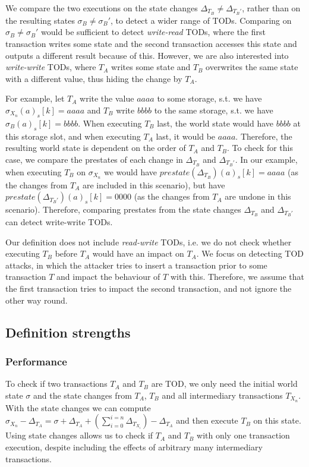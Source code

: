\documentclass[draft,final]{vutinfth} %
\begin{document}
We compare the two executions on the state changes $\Delta_{T_B} \neq \Delta_{T_B\prime}$, rather than on the resulting states $\sigma_B \neq \sigma_B\prime$, to detect a wider range of TODs. Comparing on $\sigma_B \neq \sigma_B\prime$ would be sufficient to detect \emph{write-read} TODs, where the first transaction writes some state and the second transaction accesses this state and outputs a different result because of this. However, we are also interested into \emph{write-write} TODs, where $T_A$ writes some state and $T_B$ overwrites the same state with a different value, thus hiding the change by $T_A$.

For example, let $T_A$ write the value $aaaa$ to some storage, s.t. we have $\sigma_{X_n}(a)_s[k] = aaaa$ and $T_B$ write $bbbb$ to the same storage, s.t. we have $\sigma_B(a)_s[k] = bbbb$. When executing $T_B$ last, the world state would have $bbbb$ at this storage slot, and when executing $T_A$ last, it would be $aaaa$. Therefore, the resulting world state is dependent on the order of $T_A$ and $T_B$. To check for this case, we compare the prestates of each change in $\Delta_{T_B}$ and $\Delta_{T_B\prime}$. In our example, when executing $T_B$ on $\sigma_{X_n}$ we would have $prestate(\Delta_{T_B})(a)_s[k] = aaaa$ (as the changes from $T_A$ are included in this scenario), but have $prestate(\Delta_{T_B\prime})(a)_s[k] = 0000$ (as the changes from $T_A$ are undone in this scenario). Therefore, comparing prestates from the state changes $\Delta_{T_B}$ and $\Delta_{T_B\prime}$ can detect write-write TODs.

Our definition does not include \emph{read-write} TODs, i.e. we do not check whether executing $T_B$ before $T_A$ would have an impact on $T_A$. We focus on detecting TOD attacks, in which the attacker tries to insert a transaction prior to some transaction $T$ and impact the behaviour of $T$ with this. Therefore, we assume that the first transaction tries to impact the second transaction, and not ignore the other way round.

\subsection{Definition strengths}

\subsubsection{Performance}

To check if two transactions $T_A$ and $T_B$ are TOD, we only need the initial world state $\sigma$ and the state changes from $T_A$, $T_B$ and all intermediary transactions $T_{X_n}$. With the state changes we can compute $\sigma_{X_n} - \Delta_{T_A} = \sigma + \Delta_{T_A} + (\sum_{i=0}^{i=n} \Delta_{T_{X_i}}) - \Delta_{T_A}$ and then execute $T_B$ on this state. Using state changes allows us to check if $T_A$ and $T_B$ with only one transaction execution, despite including the effects of arbitrary many intermediary transactions.
\end{document}

